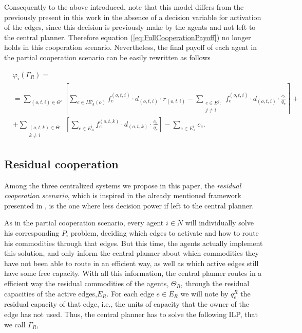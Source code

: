 \documentclass[review]{elsarticle}
\begin{document}
Consequently to the above introduced, note that this model differs from the previously present in this work in the absence of a decision variable for activation of the edges, since this decision is previously make by the agents and not left to the central planner. Therefore equation (\ref{eq:FullCooperationPayoff}) no longer holds in this cooperation scenario. Nevertheless, the final payoff of each agent in the partial cooperation scenario can be easily rewritten as follows

\begin{equation}
    \begin{split}
    & \varphi_i(\Gamma_R) =\label{eq:PartialCooperationPayoff} \\
    & = \sum_{(o,t,i)\in \Theta^i} \left[ \sum_{e \in IE_A^i(o)} f_e^{(o,t,i)} \cdot d_{(o,t,i)} \cdot r_{(o,t,i)} -  \sum_{\substack{e\in E^j \colon\\ j\not = i}} f_e^{(o,t,i)} \cdot d_{(o,t,i)} \cdot \frac{c_e}{q_e} \right] + \\
    & + \sum_{\substack{(o,t,k) \in \Theta  \colon \\ k \not = i}} \left[\sum_{e \in E_A^i} f_e^{(o,t,k)} \cdot d_{(o,t,k)} \cdot \frac{c_e}{q_e}\right] - \sum_{e \in E_A^i} c_e.
    \end{split}
\end{equation}

\subsection{Residual cooperation}

Among the three centralized systems we propose in this paper, the
\emph{residual cooperation scenario}, which is inspired in the already mentioned framework presented in \cite{ANUPINDI2001}, is the one where less decision power if left to the central planner.

As in the partial cooperation scenario, every agent $i\in N$ will individually solve his corresponding $P_i$ problem, deciding which edges to activate and how to route his commodities through that edges. But this time, the agents actually implement this solution, and only inform the central planner about which commodities they have not been able to route in an efficient way, as well as which active edges still have some free capacity. With all this information, the central planner routes in a efficient way the residual commodities of the agents, $\Theta_R$, through the residual capacities of the active edges,$E_R$. For each edge $e \in E_R$ we will note by $q_e^R$ the residual capacity of that edge, i.e., the units of capacity that the owner of the edge has not used. Thus, the central planner has to solve the following ILP, that we call $\Gamma_R$,
\end{document}
